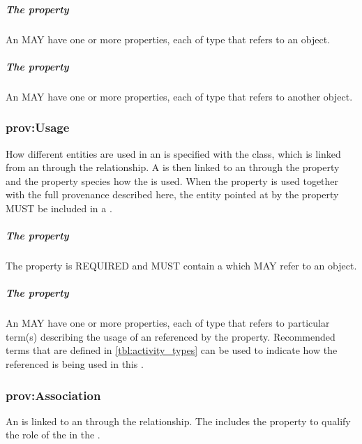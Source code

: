 \subparagraph{The  property}\label{sec:prov:qualifiedUsage}

An  MAY have one or more  properties, each of type  that refers to an  object.

\subparagraph{The  property}\label{sec:prov:wasInformedBy}

An  MAY have one or more  properties, each of type  that refers to another  object.

\subsubsection{prov:Usage}
\label{sec:prov:Usage}

How different entities are used in an  is specified with the  class, which is linked from an  through the  relationship. A  is then linked to an  through the  property  and the  property species how the  is used.  When the  property is used together with the full provenance described here, the entity pointed at by the  property MUST be included in a .

\subparagraph{The  property}\label{sec:prov:entity}

The  property is REQUIRED and MUST contain a  which MAY refer to an  object.

\subparagraph{The  property}\label{sec:prov:hadRole:U}

An  MAY have one or more  properties, each of type  that refers to particular term(s) describing the usage of an  referenced by the  property. Recommended terms that are defined in \ref{tbl:activity_types} can be used to indicate how the referenced  is being used in this .

\subsubsection{prov:Association}
\label{sec:prov:Association}

An  is linked to an  through the  relationship. The  includes the  property to qualify the role of the  in the .


